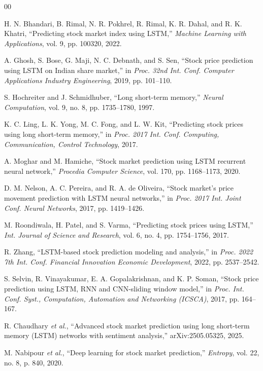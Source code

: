 \documentclass[conference]{IEEEtran}
\begin{document}
\begin{thebibliography}{00}

 H. N. Bhandari, B. Rimal, N. R. Pokhrel, R. Rimal, K. R. Dahal, and R. K. Khatri, ``Predicting stock market index using LSTM,'' \textit{Machine Learning with Applications}, vol. 9, pp. 100320, 2022.

 A. Ghosh, S. Bose, G. Maji, N. C. Debnath, and S. Sen, ``Stock price prediction using LSTM on Indian share market,'' in \textit{Proc. 32nd Int. Conf. Computer Applications Industry Engineering}, 2019, pp. 101--110.

 S. Hochreiter and J. Schmidhuber, ``Long short-term memory,'' \textit{Neural Computation}, vol. 9, no. 8, pp. 1735--1780, 1997.

 K. C. Ling, L. K. Yong, M. C. Fong, and L. W. Kit, ``Predicting stock prices using long short-term memory,'' in \textit{Proc. 2017 Int. Conf. Computing, Communication, Control Technology}, 2017.

 A. Moghar and M. Hamiche, ``Stock market prediction using LSTM recurrent neural network,'' \textit{Procedia Computer Science}, vol. 170, pp. 1168--1173, 2020.

 D. M. Nelson, A. C. Pereira, and R. A. de Oliveira, ``Stock market's price movement prediction with LSTM neural networks,'' in \textit{Proc. 2017 Int. Joint Conf. Neural Networks}, 2017, pp. 1419--1426.

 M. Roondiwala, H. Patel, and S. Varma, ``Predicting stock prices using LSTM,'' \textit{Int. Journal of Science and Research}, vol. 6, no. 4, pp. 1754--1756, 2017.

 R. Zhang, ``LSTM-based stock prediction modeling and analysis,'' in \textit{Proc. 2022 7th Int. Conf. Financial Innovation Economic Development}, 2022, pp. 2537--2542.

 S. Selvin, R. Vinayakumar, E. A. Gopalakrishnan, and K. P. Soman, ``Stock price prediction using LSTM, RNN and CNN-sliding window model,'' in \textit{Proc. Int. Conf. Syst., Computation, Automation and Networking (ICSCA)}, 2017, pp. 164--167.

 R. Chaudhary \textit{et al.}, ``Advanced stock market prediction using long short-term memory (LSTM) networks with sentiment analysis,'' arXiv:2505.05325, 2025.

 M. Nabipour \textit{et al.}, ``Deep learning for stock market prediction,'' \textit{Entropy}, vol. 22, no. 8, p. 840, 2020.


\end{thebibliography}
\end{document}
